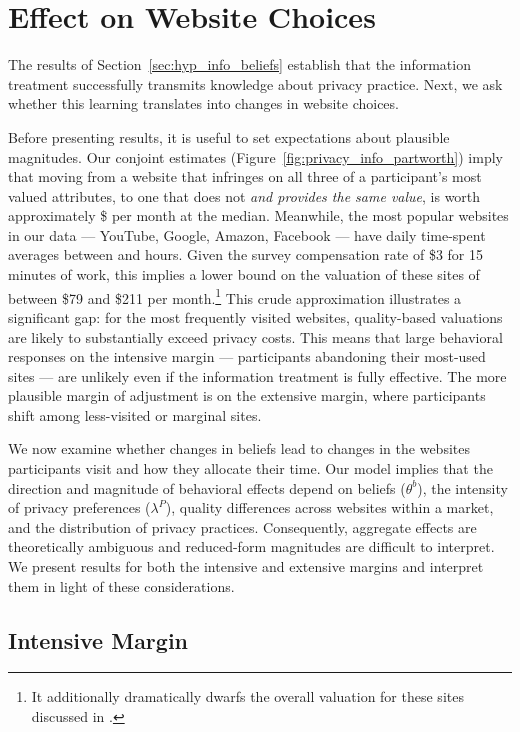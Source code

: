 \documentclass[12pt]{article}
\theoremstyle{definition}
\theoremstyle{remark}
\begin{document}
\section{Effect on Website Choices}\label{sec:website_choice}

The results of Section~\ref{sec:hyp_info_beliefs} establish that the information treatment successfully transmits knowledge about privacy practice. Next, we ask whether this learning translates into changes in website choices.

Before presenting results, it is useful to set expectations about plausible magnitudes. Our conjoint estimates (Figure~\ref{fig:privacy_info_partworth}) imply that moving from a website that infringes on all three of a participant's most valued attributes, to one that does not \emph{and provides the same value}, is worth approximately \$\wtpTopThreeMedian{} per month at the median. Meanwhile, the most popular websites in our data --- YouTube, Google, Amazon, Facebook --- have daily time-spent averages between \topWebFourActiveHours{} and \topWebOneActiveHours{} hours. Given the survey compensation rate of \$3 for 15 minutes of work, this implies a lower bound on the valuation of these sites of between \$79 and \$211 per month.\footnote{It additionally dramatically dwarfs the overall valuation for these sites discussed in \cite{brynjolfsson2019using}.} This crude approximation illustrates a significant gap: for the most frequently visited websites, quality-based valuations are likely to substantially exceed privacy costs. This means that large behavioral responses on the intensive margin --- participants abandoning their most-used sites --- are unlikely even if the information treatment is fully effective. The more plausible margin of adjustment is on the extensive margin, where participants shift among less-visited or marginal sites.
 
We now examine whether changes in beliefs lead to changes in the websites participants visit and how they allocate their time. Our model implies that the direction and magnitude of behavioral effects depend on beliefs ($\theta^b$), the intensity of privacy preferences ($\lambda^P$), quality differences across websites within a market, and the distribution of privacy practices. Consequently, aggregate effects are theoretically ambiguous and reduced-form magnitudes are difficult to interpret. We present results for both the intensive and extensive margins and interpret them in light of these considerations.

\subsection{Intensive Margin}
 
\end{document}
